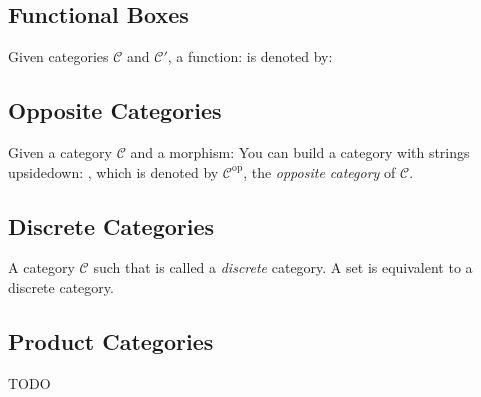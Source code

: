 \subsection{Functional Boxes}

Given categories $\mathcal{C}$ and $\mathcal{C}'$, a function:
is denoted by:


\subsection{Opposite Categories}

Given a category $\mathcal{C}$ and a morphism:
You can build a category with strings upsidedown:
, which is denoted by $\mathcal{C}^{\operatorname{op}}$, the \textit{opposite category} of $\mathcal{C}$.

\subsection{Discrete Categories}

A category $\mathcal{C}$ such that
is called a \textit{discrete} category.
A set is equivalent to a discrete category.


\subsection{Product Categories}
TODO 

